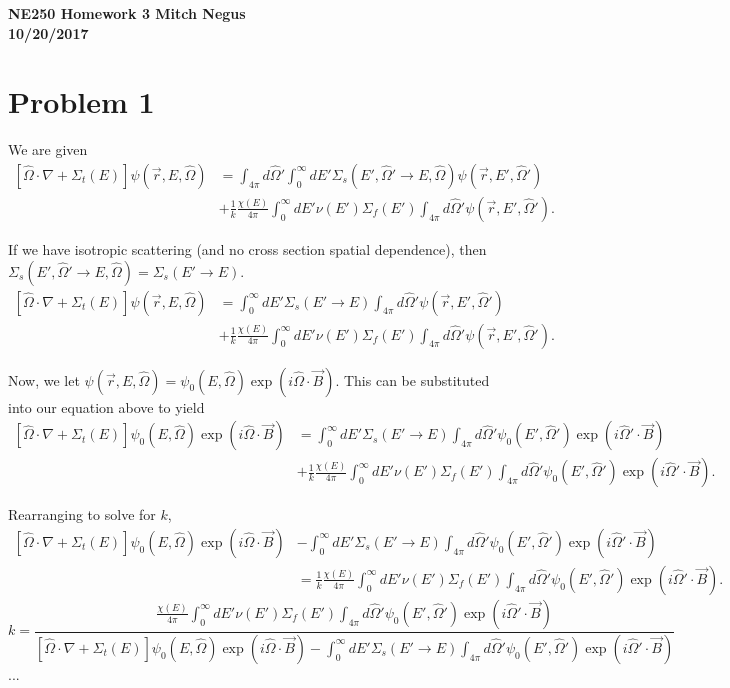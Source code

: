 \documentclass{article}
\newcommand{\Xs}{\Sigma}
\newcommand{\pos}{\vec{r}}
\newcommand{\Oh}{\hat{\Omega}}
\newcommand{\intfp}{\int_{4\pi}}
\newcommand{\intzi}{\int_0^{\infty}}
\newcommand{\rEO}{(\pos,E,\Oh)}
\newcommand{\rEOprime}{(\pos,E',\Oh')}
\newcommand{\EO}{(E,\Oh)}
\newcommand{\EOprime}{(E',\Oh')}
\begin{document}
\thispagestyle{empty}

{\bf {\large {NE250 Homework {3} \hfill Mitch Negus\\
		\hspace*{\fill} 10/20/2017\\ }}}
		
		
		

\section*{Problem 1}

We are given
\begin{align*}
\left[\Oh \cdot \nabla + \Xs_t(E) \right] \psi\rEO &= \intfp d\Oh' \intzi dE' \Xs_s(E',\Oh' \rightarrow E,\Oh)\psi\rEOprime \\
&+ \frac{1}{k}\frac{\chi(E)}{4\pi} \intzi dE' \nu(E') \Xs_f(E') \intfp d\Oh' \psi\rEOprime.
\end{align*}

If we have isotropic scattering (and no cross section spatial dependence), then $\Xs_s(E',\Oh' \rightarrow E,\Oh) = \Xs_s(E' \rightarrow E)$.
\begin{align*}
\left[\Oh \cdot \nabla + \Xs_t(E) \right] \psi\rEO &= \intzi dE' \Xs_s(E' \rightarrow E) \intfp d\Oh' \psi\rEOprime \\
&+ \frac{1}{k}\frac{\chi(E)}{4\pi} \intzi dE' \nu(E') \Xs_f(E') \intfp d\Oh' \psi\rEOprime.
\end{align*}

Now, we let $\psi\rEO = \psi_0\EO\exp(i \Oh \cdot \vec{B})$. This can be substituted into our equation above to yield
\begin{align*}
\left[\Oh \cdot \nabla + \Xs_t(E) \right] \psi_0\EO\exp(i \Oh \cdot \vec{B}) &= \intzi dE' \Xs_s(E' \rightarrow E) \intfp d\Oh' \psi_0\EOprime\exp(i \Oh' \cdot \vec{B}) \\
&+ \frac{1}{k}\frac{\chi(E)}{4\pi} \intzi dE' \nu(E') \Xs_f(E') \intfp d\Oh' \psi_0\EOprime\exp(i \Oh' \cdot \vec{B}).
\end{align*}

Rearranging to solve for $k$,
\begin{align*}
\left[\Oh \cdot \nabla + \Xs_t(E) \right] \psi_0\EO\exp(i \Oh \cdot \vec{B}) &- \intzi dE' \Xs_s(E' \rightarrow E) \intfp d\Oh' \psi_0\EOprime\exp(i \Oh' \cdot \vec{B}) \\
& = \frac{1}{k}\frac{\chi(E)}{4\pi} \intzi dE' \nu(E') \Xs_f(E') \intfp d\Oh' \psi_0\EOprime\exp(i \Oh' \cdot \vec{B}).
\end{align*}
$$ k = \frac{\frac{\chi(E)}{4\pi} \intzi dE' \nu(E') \Xs_f(E') \intfp d\Oh' \psi_0\EOprime\exp(i \Oh' \cdot \vec{B})}{\left[\Oh \cdot \nabla + \Xs_t(E) \right] \psi_0\EO\exp(i \Oh \cdot \vec{B}) - \intzi dE' \Xs_s(E' \rightarrow E) \intfp d\Oh' \psi_0\EOprime\exp(i \Oh' \cdot \vec{B})} $$
...
\end{document}
